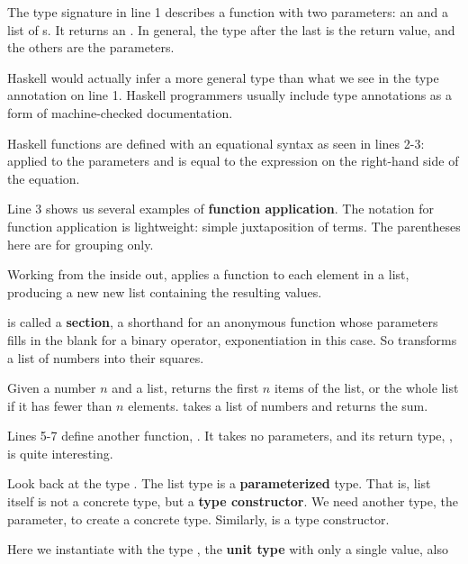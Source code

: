 \begin{notelist}
    \item The type signature in line 1 describes a function with two parameters: an  and a list
          of s. It returns an . In general, the type after the last \code{->}
          is the return value, and the others are the parameters.
    \item Haskell would actually infer a more general type than what we see in the type annotation 
          on line 1. Haskell programmers usually include type annotations as a form of machine-checked
          documentation.
    \item Haskell functions are defined with an equational syntax as seen in lines 2-3: 
          applied to the parameters  and  is equal to the expression on the
          right-hand side of the equation.
    \item Line 3 shows us several examples of \textbf{function application}. The notation for function application
          is lightweight: simple juxtaposition of terms. The parentheses here are for grouping only. 
    \item Working from the inside out,  applies a function to each element in a list, producing a new 
          new list containing the resulting values.
    \item {} is called a \textbf{section}, a shorthand for an anonymous function whose parameters
          fills in the blank for a binary operator, exponentiation in this case. So 
          transforms a list of numbers into their squares.
    \item Given a number $n$ and a list,  returns the first $n$ items of the list, or the whole list
          if it has fewer than $n$ elements.  takes a list of numbers and returns the sum.
    \item Lines 5-7 define another function, . It takes no parameters, and its return type, ,
          is quite interesting.
    \item Look back at the type \code{[Integer]}. The list type \code{[]} is a
          \textbf{parameterized} type. That is, list itself is not a concrete type, but a \textbf{type constructor}.
          We need another type, the parameter, to create a concrete type. Similarly,  is a type constructor.
    \item Here we instantiate  with the type \code{()}, the \textbf{unit type} with only a single value, also

\end{notelist}
